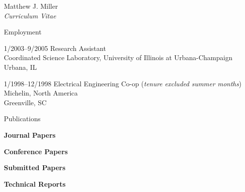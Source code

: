 \documentclass[10pt]{article}
\begin{document}
\begin{cv}{Matthew J. Miller\\{\large \itshape Curriculum Vitae}}
\pagebreak

\begin{cvlist}{Employment}
	\item[1/2003--9/2005] Research Assistant\\
	Coordinated Science Laboratory, University of Illinois at 
	Urbana-Champaign\\
	Urbana, IL
	\item[1/1998--12/1998] Electrical Engineering Co-op 
	(\textit{tenure excluded summer months})\\
	Michelin, North America\\
	Greenville, SC
\end{cvlist}

\setlength{\oldcvlabelwidth}{\cvlabelwidth}
\setlength{\cvlabelwidth}{1em}
\renewcommand*{\bibindent}{1.5em}
\newcommand*{\biblabelsep}{1.5em}

\begin{cvlist}{Publications}
	\item \textbf{Journal Papers}
	\item \textbf{Conference Papers} 
	\item \textbf{Submitted Papers} 
	\item \textbf{Technical Reports} 
\end{cvlist}
\setlength{\cvlabelwidth}{\oldcvlabelwidth}


\end{cv}
\end{document}
